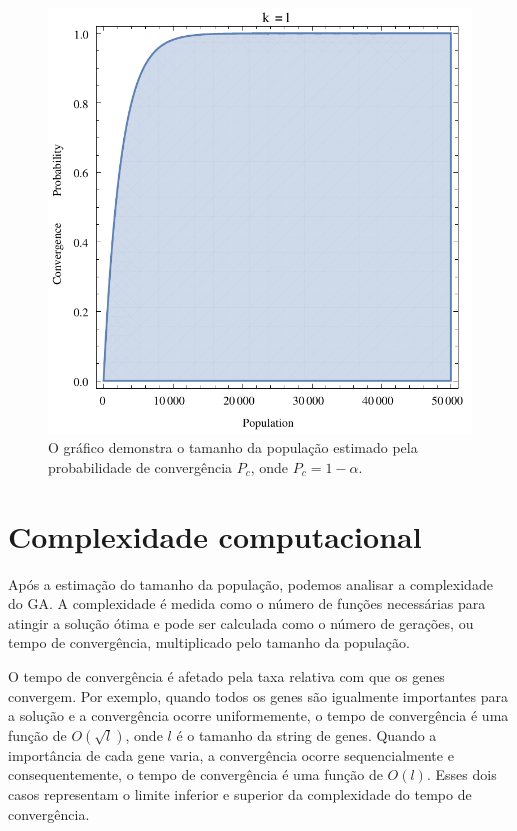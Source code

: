 \documentclass[]{scrreprt}
\begin{document}
\begin{figure}
	\label{fig_n}
	\includegraphics{fig1}
	\caption{O gráfico demonstra o tamanho da população estimado pela probabilidade de convergência $P_{c}$, onde $P_{c}=1-\alpha$.}
\end{figure}

\section{Complexidade computacional}

Após a estimação do tamanho da população, podemos analisar a complexidade do GA. A complexidade é medida como o número de funções necessárias para atingir a solução ótima e pode ser calculada como o número de gerações, ou tempo de convergência, multiplicado pelo tamanho da população. 

O tempo de convergência é afetado pela taxa relativa com que os genes convergem. Por exemplo, quando todos os genes são igualmente importantes para a solução e a convergência ocorre uniformemente, o tempo de convergência é  uma função de $O(\sqrt{l})$, onde $l$ é o tamanho da string de genes. Quando a importância de cada gene varia, a convergência ocorre sequencialmente e consequentemente, o tempo de convergência é uma função de $O(l)$. Esses dois casos representam o limite inferior e superior da complexidade do tempo de convergência.
\end{document}
